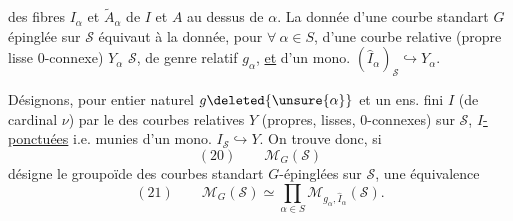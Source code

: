des fibres $I_\alpha$ et $\widetilde A_\alpha$ de $I$ et $A$ au dessus de $\alpha$. La donnée d'une courbe standart $G$ épinglée sur $\mathcal S$ équivaut à la donnée,  pour $\forall\ \alpha\in S$, d'une courbe relative (propre lisse  $0$-connexe) $Y_\alpha$  $\mathcal S$, de genre relatif $g_\alpha$, \uline{et} d'un mono. $(\widehat I_\alpha)_{\mathcal S}\hookrightarrow Y_\alpha$.

Désignons,  pour  entier naturel $g\deleted{\unsure{\alpha}}$ et un ens. fini $I$ (de cardinal $\nu$) par
le  des courbes relatives $Y$ (propres, lisses, $0$-connexes) sur $\mathcal S$, \uline{$I$-ponctuées} i.e. munies d'un mono. $I_{\mathcal S}\hookrightarrow Y$. On trouve donc, si
\[
(20)\qquad\mathcal M_G(\mathcal S)
\]
désigne le groupoïde des courbes standart $G$-épinglées sur $\mathcal S$, une équivalence
\[
(21)\qquad\mathcal M_G(\mathcal S)\simeq\prod_{\alpha\in S}\mathcal M_{g_\alpha,\widehat I_\alpha}(\mathcal S).
\]
